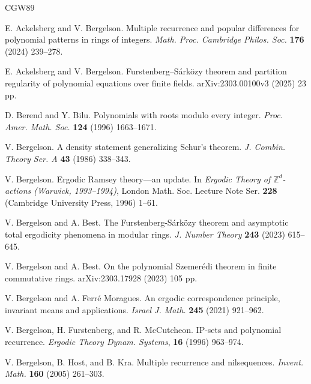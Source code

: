 \documentclass{amsart}
\theoremstyle{definition}
\numberwithin{equation}{section}
\newcommand{\Z}{\mathbb{Z}}
\begin{document}

\begin{thebibliography}{CGW89}

E. Ackelsberg and V. Bergelson.
\newblock Multiple recurrence and popular differences for polynomial patterns in rings of integers.
\newblock   \emph{Math. Proc. Cambridge Philos. Soc.} \textbf{176} (2024) 239--278.

E. Ackelsberg and V. Bergelson.
\newblock Furstenberg--S\'{a}rk\"{o}zy theorem and partition regularity of polynomial equations over finite fields.
\newblock   arXiv:2303.00100v3 (2025) 23 pp.

D. Berend and Y. Bilu.
\newblock	Polynomials with roots modulo every integer.
\newblock	\emph{Proc. Amer. Math. Soc.} \textbf{124} (1996) 1663--1671.

V. Bergelson.
\newblock	A density statement generalizing Schur's theorem.
\newblock	\emph{J. Combin. Theory Ser. A} \textbf{43} (1986) 338--343.

V. Bergelson.
\newblock	Ergodic Ramsey theory---an update.
\newblock	In \emph{Ergodic Theory of $\Z^d$-actions (Warwick, 1993--1994)}, London Math. Soc. Lecture Note Ser. \textbf{228} (Cambridge University Press, 1996) 1--61.

V. Bergelson and A. Best.
\newblock	The Furstenberg-S\'{a}rk\"{o}zy theorem and asymptotic total ergodicity phenomena in modular rings.
\newblock	\emph{J. Number Theory} \textbf{243} (2023) 615--645.

V. Bergelson and A. Best.
\newblock   On the polynomial Szemer\'{e}di theorem in finite commutative rings.
\newblock   arXiv:2303.17928 (2023) 105 pp.

V. Bergelson and A. Ferr\'{e} Moragues.
\newblock   An ergodic correspondence principle, invariant means and applications.
\newblock   \emph{Israel J. Math.} \textbf{245} (2021) 921--962.

V. Bergelson, H. Furstenberg, and R. McCutcheon.
\newblock IP-sets and polynomial recurrence.
\newblock \emph{Ergodic Theory Dynam. Systems}, \textbf{16} (1996) 963--974.

V. Bergelson, B. Host, and B. Kra.
\newblock   Multiple recurrence and nilsequences.
\newblock   \emph{Invent. Math.} \textbf{160} (2005) 261--303.


\end{thebibliography}
\end{document}
